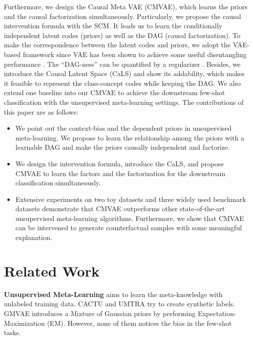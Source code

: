 \documentclass[letterpaper]{article} \usepackage{aaai23}  \usepackage{times}  \usepackage{helvet}  \usepackage{courier}  \usepackage[hyphens]{url}  \usepackage{graphicx} \urlstyle{rm} \def\UrlFont{\rm}  \usepackage{natbib}  \usepackage{caption} \frenchspacing  \setlength{\pdfpagewidth}{8.5in}  \setlength{\pdfpageheight}{11in}  \usepackage{algorithm}
\theoremstyle{plain}
\theoremstyle{definition}
\theoremstyle{remark}
\begin{document}
Furthermore, we design the Causal Meta VAE (CMVAE), which learns the priors and the causal factorization simultaneously. Particularly, we propose the causal intervention formula with the SCM. It leads us to learn the conditionally independent latent codes (priors) as well as the DAG (causal factorization). To make the correspondence between the latent codes and priors, we adopt the VAE-based framework \cite{Kingma2014vae} since VAE has been shown to achieve some useful disentangling performance \cite{higgins2016beta}. The ``DAG-ness'' can be quantified by a regularizer \cite{Zheng2018dags}. Besides, we introduce the Causal Latent Space (CaLS) and show its addability, which makes it feasible to represent the class-concept codes while keeping the DAG. We also extend one baseline \cite{lee2021metagmvae} into our CMVAE to achieve the downstream few-shot classification with the unsupervised meta-learning settings. The contributions of this paper are as follows: 
\begin{itemize}
	\item We point out the context-bias and the dependent priors in unsupervised meta-learning. We propose to learn the relationship among the priors with a learnable DAG and make the priors causally independent and factorize.
	\item We design the intervention formula, introduce the CaLS, and propose CMVAE to learn the factors and the factorization for the downstream classification simultaneously.
	\item Extensive experiments on two toy datasets and three widely used benchmark datasets demonstrate that CMVAE outperforms other state-of-the-art unsupervised meta-learning algorithms. Furthermore, we show that CMVAE can be intervened to generate counterfactual samples with some meaningful explanation.
\end{itemize}




\section{Related Work}

\textbf{Unsupervised Meta-Learning} aims to learn the meta-knowledge with unlabeled training data. CACTU \cite{hsu2018unsupervised} and UMTRA \cite{khodadadeh2018unsupervised} try to create synthetic labels. GMVAE \cite{lee2021metagmvae} introduces a Mixture of Gaussian priors by performing Expectation-Maximization (EM). However, none of them notices the  bias in the few-shot tasks.
\end{document}
